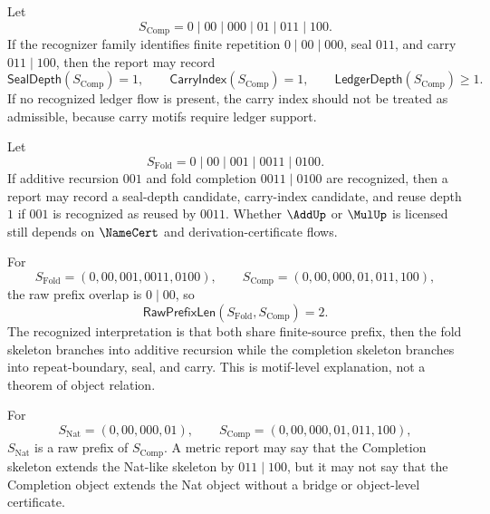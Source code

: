 \begin{example}
\label{ex:metrics-completion-skeleton}
Let
$$
  S_{\mathrm{Comp}}=0\mid 00\mid 000\mid 01\mid 011\mid 100.
$$
If the recognizer family identifies finite repetition $0\mid 00\mid 000$, seal $011$, and carry $011\mid 100$, then the report may record
$$
  \mathsf{SealDepth}(S_{\mathrm{Comp}})=1,\qquad
  \mathsf{CarryIndex}(S_{\mathrm{Comp}})=1,\qquad
  \mathsf{LedgerDepth}(S_{\mathrm{Comp}})\geq 1.
$$
If no recognized ledger flow is present, the carry index should not be treated as admissible, because carry motifs require ledger support.
\end{example}

\begin{example}
\label{ex:metrics-add-fold-skeleton}
Let
$$
  S_{\mathrm{Fold}}=0\mid 00\mid 001\mid 0011\mid 0100.
$$
If additive recursion $001$ and fold completion $0011\mid 0100$ are recognized, then a report may record a seal-depth candidate, carry-index candidate, and reuse depth $1$ if $001$ is recognized as reused by $0011$. Whether $\AddUp$ or $\MulUp$ is licensed still depends on $\NameCert$ and derivation-certificate flows.
\end{example}

\begin{example}
\label{ex:metrics-fold-completion-prefix}
For
$$
  S_{\mathrm{Fold}}=(0,00,001,0011,0100),
  \qquad
  S_{\mathrm{Comp}}=(0,00,000,01,011,100),
$$
the raw prefix overlap is $0\mid 00$, so
$$
  \mathsf{RawPrefixLen}(S_{\mathrm{Fold}},S_{\mathrm{Comp}})=2.
$$
The recognized interpretation is that both share finite-source prefix, then the fold skeleton branches into additive recursion while the completion skeleton branches into repeat-boundary, seal, and carry. This is motif-level explanation, not a theorem of object relation.
\end{example}

\begin{example}
\label{ex:metrics-nat-completion}
For
$$
  S_{\mathrm{Nat}}=(0,00,000,01),
  \qquad
  S_{\mathrm{Comp}}=(0,00,000,01,011,100),
$$
$S_{\mathrm{Nat}}$ is a raw prefix of $S_{\mathrm{Comp}}$. A metric report may say that the Completion skeleton extends the Nat-like skeleton by $011\mid 100$, but it may not say that the Completion object extends the Nat object without a bridge or object-level certificate.
\end{example}

